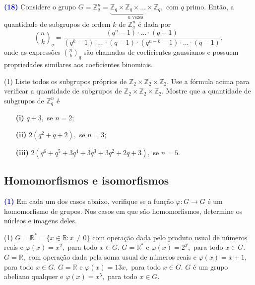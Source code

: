 \documentclass[12pt, a4paper]{article}
\newcommand{\negrito}[1]{\mbox{\boldmath{$#1$}}}
\begin{document}
\textcolor{blue}{\bf(18)}\label{56} Considere o grupo $G = \mathbb{Z}_q^n = \underbrace{\mathbb{Z}_q \times \mathbb{Z}_q \times \ldots \times \mathbb{Z}_q}_{n \mbox{ vezes}},$ com $q$ primo. Então, a quantidade de subgrupos de ordem $k$ de $\mathbb{Z}_q^n$ é dada por
\[
\binom{n}{k}_q = \frac{(q^n - 1) \cdot \ldots \cdot (q - 1)}{(q^k - 1) \cdot \ldots \cdot (q - 1) \cdot (q^{n-k}-1) \cdot \ldots \cdot (q - 1)},
\]
onde as expressões $\binom{n}{k}_q$ são chamadas de coeficientes gaussianos e possuem propriedades similares aos coeficientes binomiais. 
\begin{tasks}[counter-format={(tsk[a])},label-width=3.6ex, label-format = {\bfseries}, column-sep = {0pt}](1)
\task[\textcolor{Floresta}{$\negrito{(a)} $}] Liste todos os subgrupos próprios de $\mathbb{Z}_2 \times \mathbb{Z}_2 \times \mathbb{Z}_2.$
\task[\textcolor{Floresta}{$\negrito{(b)} $}] Use a fórmula acima para verificar a quantidade de subgrupos de $\mathbb{Z}_2 \times \mathbb{Z}_2 \times \mathbb{Z}_2.$
\task[\textcolor{Floresta}{$\negrito{(c)} $}] Mostre que a quantidade de subgrupos de $\mathbb{Z}_q^n$ é
\begin{itemize}
    \item[\textbf{(i)}] $q+3,$ se $n =2;$%
    \item[\textbf{(ii)}] $2(q^2+q+2),$ se $n =3;$%
    \item[\textbf{(iii)}] $2(q^6+q^5+3q^4+3q^3+3q^2 +2q+3),$ se $n =5.$%
\end{itemize}
\end{tasks}
\newpage
\subsection{\textcolor{Floresta}{Homomorfismos e isomorfismos}}
\textcolor{blue}{\bf(1)}\label{57} Em cada um dos casos abaixo, verifique se a função $\varphi \colon G \to G$ é um homomorfismo de grupos. Nos casos em que são homomorfismos, determine os núcleos e imagens deles.
\begin{tasks}[counter-format={(tsk[a])},label-width=3.6ex, label-format = {\bfseries}, column-sep = {0pt}](1)
\task[\textcolor{Floresta}{$\negrito{(a)} $}] $G = \mathbb{R}^{*} = \{ x \in \mathbb{R} : x \neq 0 \}$ com operação dada pelo produto usual de números reais e $\varphi(x) = x^2,$ para todo $x \in G.$
\task[\textcolor{Floresta}{$\negrito{(b)} $}] $G = \mathbb{R}^{*}$ e $\varphi(x) = 2^x,$ para todo $x \in G.$
\task[\textcolor{Floresta}{$\negrito{(c)} $}] $G = \mathbb{R},$ com operação dada pela soma usual de números reais e $\varphi(x) = x + 1,$ para todo $x \in G.$
\task[\textcolor{Floresta}{$\negrito{(d)} $}] $G = \mathbb{R}$ e $\varphi(x) = 13x,$ para todo $x \in G.$
\task[\textcolor{Floresta}{$\negrito{(e)} $}] $G$ é um grupo abeliano qualquer e $\varphi(x) = x^5,$ para todo $x \in G.$
\end{tasks}
\end{document}

